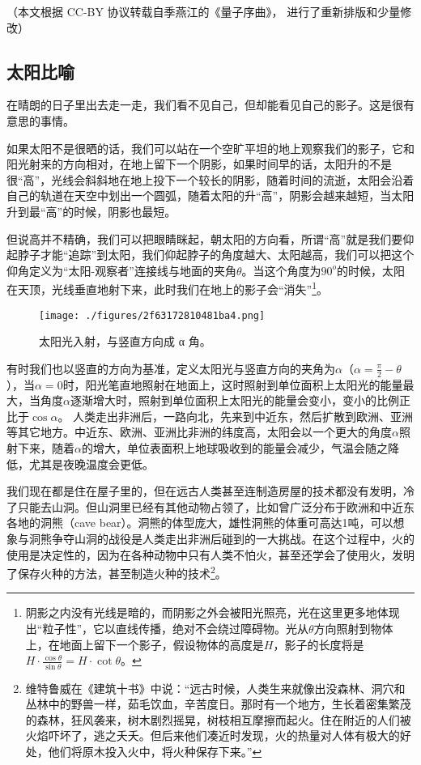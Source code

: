 
（本文根据 CC-BY 协议转载自季燕江的《量子序曲》， 进行了重新排版和少量修改）

\subsection{太阳比喻}

在晴朗的日子里出去走一走，我们看不见自己，但却能看见自己的影子。这是很有意思的事情。

如果太阳不是很晒的话，我们可以站在一个空旷平坦的地上观察我们的影子，它和阳光射来的方向相对，在地上留下一个阴影，如果时间早的话，太阳升的不是很“高”，光线会斜斜地在地上投下一个较长的阴影，随着时间的流逝，太阳会沿着自己的轨道在天空中划出一个圆弧，随着太阳的升“高”，阴影会越来越短，当太阳升到最“高”的时候，阴影也最短。

但说高并不精确，我们可以把眼睛眯起，朝太阳的方向看，所谓“高”就是我们要仰起脖子才能“追踪”到太阳，我们仰起脖子的角度越大、太阳越高，我们可以把这个仰角定义为“太阳-观察者”连接线与地面的夹角$\theta$。当这个角度为$90^o$的时候，太阳在天顶，光线垂直地射下来，此时我们在地上的影子会“消失”\footnote{阴影之内没有光线是暗的，而阴影之外会被阳光照亮，光在这里更多地体现出“粒子性”，它以直线传播，绝对不会绕过障碍物。光从$\theta$方向照射到物体上，在地面上留下一个影子，假设物体的高度是$H$，影子的长度将是$H \cdot \frac{\cos \theta}{\sin \theta } = H \cdot \cot \theta$。}。

\begin{figure}[ht]
\centering
\texttt{[image: ./figures/2f63172810481ba4.png]}
\caption{太阳光⼊射，与竖直⽅向成 α 角。} \label{fig_QMPre3_4}
\end{figure}

有时我们也以竖直的方向为基准，定义太阳光与竖直方向的夹角为$\alpha$（$\alpha = \frac{\pi}{2} - \theta $），当$\alpha = 0$时，阳光笔直地照射在地面上，这时照射到单位面积上太阳光的能量最大，当角度$\alpha$逐渐增大时，照射到单位面积上太阳光的能量会变小，变小的比例正比于$\cos \alpha$。
人类走出非洲后，一路向北，先来到中近东，然后扩散到欧洲、亚洲等其它地方。中近东、欧洲、亚洲比非洲的纬度高，太阳会以一个更大的角度$\alpha$照射下来，随着$\alpha$的增大，单位表面积上地球吸收到的能量会减少，气温会随之降低，尤其是夜晚温度会更低。

我们现在都是住在屋子里的，但在远古人类甚至连制造房屋的技术都没有发明，冷了只能去山洞。但山洞里已经有其他动物占领了，比如曾广泛分布于欧洲和中近东各地的洞熊（cave bear）。洞熊的体型庞大，雄性洞熊的体重可高达1吨，可以想象与洞熊争夺山洞的战役是人类走出非洲后碰到的一大挑战。在这个过程中，火的使用是决定性的，因为在各种动物中只有人类不怕火，甚至还学会了使用火，发明了保存火种的方法，甚至制造火种的技术\footnote{维特鲁威在《建筑十书》中说：“远古时候，人类生来就像出没森林、洞穴和丛林中的野兽一样，茹毛饮血，辛苦度日。那时有一个地方，生长着密集繁茂的森林，狂风袭来，树木剧烈摇晃，树枝相互摩擦而起火。住在附近的人们被火焰吓坏了，逃之夭夭。但后来他们凑近时发现，火的热量对人体有极大的好处，他们将原木投入火中，将火种保存下来。”}。

